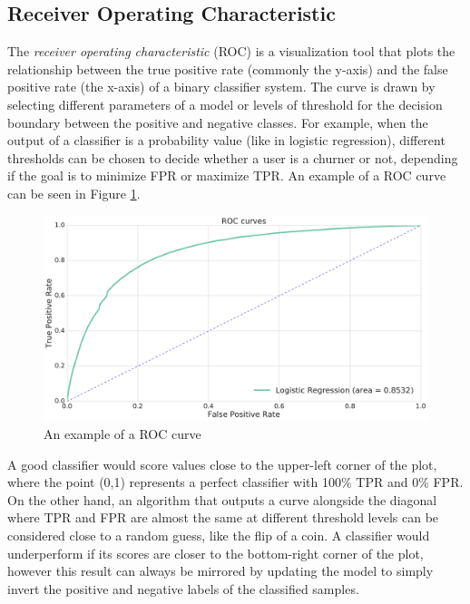 \documentclass{kththesis}
\begin{document}
\subsection{Receiver Operating Characteristic}

The \emph{receiver operating characteristic} (ROC) is a visualization tool that plots the relationship between the true positive rate (commonly the y-axis) and the false positive rate (the x-axis) of a binary classifier system. The curve is drawn by selecting different parameters of a model or levels of threshold for the decision boundary between the positive and negative classes. For example, when the output of a classifier is a probability value (like in logistic regression), different thresholds can be chosen to decide whether a user is a churner or not, depending if the goal is to minimize FPR or maximize TPR. An example of a ROC curve can be seen in Figure \ref{fig:roc_example}.

\begin{figure}[h]
    \centering
    \includegraphics[width=1.0\textwidth,keepaspectratio]{figures/roc_example.pdf}
    \caption{An example of a ROC curve}
    \label{fig:roc_example}
\end{figure}

A good classifier would score values close to the upper-left corner of the plot, where the point (0,1) represents a perfect classifier with 100\% TPR and 0\% FPR. On the other hand, an algorithm that outputs a curve alongside the diagonal where TPR and FPR are almost the same at different threshold levels can be considered close to a random guess, like the flip of a coin. A classifier would underperform if its scores are closer to the bottom-right corner of the plot, however this result can always be mirrored by updating the model to simply invert the positive and negative labels of the classified samples.
\end{document}
